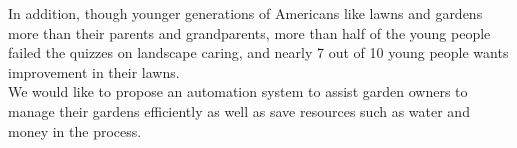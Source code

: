\documentclass[]{article}
\begin{document}
	In addition, though younger generations of Americans like lawns and gardens more than their parents and grandparents, more than half of the young people failed the quizzes on landscape caring, and nearly 7 out of 10 young people wants improvement in their lawns\cite{noauthor_new_2016}. \\
	
	We would like to propose an automation system to assist garden owners to manage their gardens efficiently as well as save resources such as water and money in the process. 
	
%	
\end{document}
